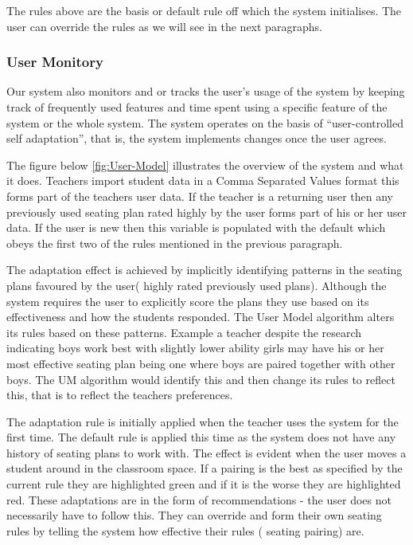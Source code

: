 The rules above are the basis or default rule off which the system initialises. The user can override the rules as we will see in the next paragraphs.
\subsubsection{User Monitory}
Our system also monitors and or tracks the user's usage of the system by keeping track of frequently used features and time spent using a specific feature of the system or the whole system. The system operates on the basis of ``user-controlled self adaptation'', that is, the system implements changes once the user agrees.

The figure below \ref{fig:User-Model} illustrates the overview of the system and what it does. Teachers import student data in a Comma Separated Values format this forms part of the teachers user data. If the teacher is a returning user then any previously used seating plan rated highly by the user forms part of his or her user data. If the user is new then this variable is populated with the default which obeys the first two of the rules mentioned in the previous paragraph.

The adaptation effect is achieved by implicitly identifying patterns in the seating plans favoured by the user( highly rated previously used plans). Although the system requires the user to explicitly score the plans they use based on its effectiveness and how the students responded. The User Model algorithm alters its rules based on these patterns. Example a teacher despite the research indicating boys work best with slightly lower ability girls may have his or her most effective seating plan being one where boys are paired together with other boys. The UM algorithm would identify this and then change its rules to reflect this, that is to reflect the teachers preferences.

The adaptation rule is initially applied when the teacher uses the system for the first time. The default rule is applied this time as the system does not have any history of seating plans to work with. The effect is evident when the user moves a student around in the classroom space. If a pairing is the best as specified by the current rule they are highlighted green and if it is the worse they are highlighted red. These adaptations are in the form of recommendations - the user does not necessarily have to follow this. They can override and form their own seating rules by telling the system how effective their rules ( seating pairing) are.


